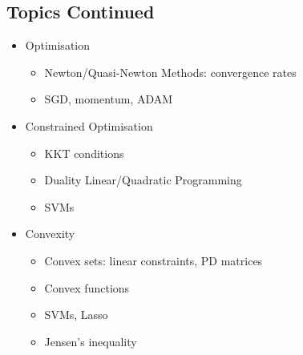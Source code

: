 
\begin{slide}
  \section[-2]{Topics Continued}

  \begin{PauseHighLight}
    \begin{itemize}
    \item Optimisation
      \begin{itemize}\squeeze
      \item Newton/Quasi-Newton Methods: convergence rates
      \item SGD, momentum, ADAM\pause
      \end{itemize}
    \item  Constrained Optimisation
      \begin{itemize}\squeeze
      \item KKT conditions
      \item Duality Linear/Quadratic Programming
      \item SVMs\pause
      \end{itemize}
    \item Convexity
      \begin{itemize}\squeeze
      \item Convex sets: linear constraints, PD matrices
      \item Convex functions
      \item SVMs, Lasso
      \item Jensen's inequality\pause
      \end{itemize}
    \end{itemize}
  \end{PauseHighLight}
\end{slide}


